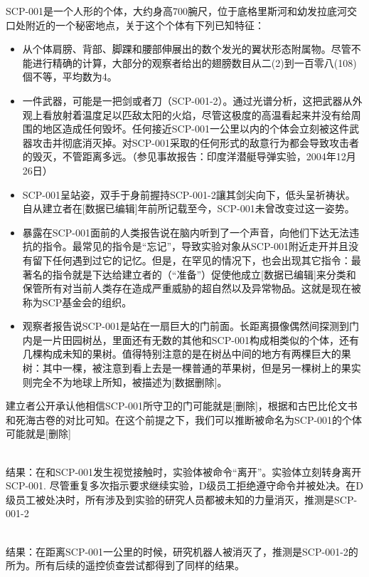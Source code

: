 SCP-001是一个人形的个体，大约身高700腕尺，位于底格里斯河和幼发拉底河交口处附近的一个秘密地点，关于这个个体有下列已知特征：

\begin{itemize}
	\item 从个体肩膀、背部、脚踝和腰部伸展出的数个发光的翼状形态附属物。尽管不能进行精确的计算，大部分的观察者给出的翅膀数目从二(2)到一百零八(108)個不等，平均数为4。
	\item 一件武器，可能是一把剑或者刀（SCP-001-2）。通过光谱分析，这把武器从外观上看放射着温度足以匹敌太阳的火焰，尽管这极度的高温看起来并没有给周围的地区造成任何毁坏。任何接近SCP-001一公里以内的个体会立刻被这件武器攻击并彻底消灭掉。对SCP-001采取的任何形式的敌意行为都会导致攻击者的毁灭，不管距离多远。（参见事故报告：印度洋潜艇导弹实验，2004年12月26日）
	\item SCP-001呈站姿，双手于身前握持SCP-001-2讓其剑尖向下，低头呈祈祷状。自从建立者在[数据已编辑]年前所记载至今，SCP-001未曾改变过这一姿势。
	\item 暴露在SCP-001面前的人类报告说在脑内听到了一个声音，向他们下达无法违抗的指令。最常见的指令是“忘记”，导致实验对象从SCP-001附近走开并且没有留下任何遇到过它的记忆。但是，在罕见的情况下，也会出现其它指令：最著名的指令就是下达给建立者的（“准备”）促使他成立[数据已编辑]来分类和保管所有对当前人类存在造成严重威胁的超自然以及异常物品。这就是现在被称为SCP基金会的组织。
	\item 观察者报告说SCP-001是站在一扇巨大的门前面。长距离摄像偶然间探测到门内是一片田园树丛，里面还有无数的其他和SCP-001构成相类似的个体，还有几棵构成未知的果树。值得特别注意的是在树丛中间的地方有两棵巨大的果树：其中一棵，被注意到看上去是一棵普通的苹果树，但是另一棵树上的果实则完全不为地球上所知，被描述为[数据删除]。
\end{itemize}

建立者公开承认他相信SCP-001所守卫的门可能就是[删除]，根据和古巴比伦文书和死海古卷的对比可知。在这个前提之下，我们可以推断被命名为SCP-001的个体可能就是[删除]

\hr


 \\
结果：在和SCP-001发生视觉接触时，实验体被命令“离开”。实验体立刻转身离开SCP-001. 尽管重复多次指示要求继续实验，D级员工拒绝遵守命令并被处决。在D级员工被处决时，所有涉及到实验的研究人员都被未知的力量消灭，推测是SCP-001-2

 \\
结果：在距离SCP-001一公里的时候，研究机器人被消灭了，推测是SCP-001-2的所为。所有后续的遥控侦查尝试都得到了同样的结果。

